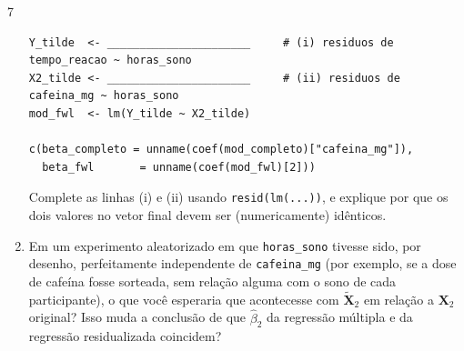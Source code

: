 \documentclass[11pt]{article}
\begin{document}
\begin{questao}{7}
\begin{enumerate}[label=(\alph*)]
\begin{lstlisting}
Y_tilde  <- ______________________     # (i) residuos de tempo_reacao ~ horas_sono
X2_tilde <- ______________________     # (ii) residuos de cafeina_mg ~ horas_sono
mod_fwl  <- lm(Y_tilde ~ X2_tilde)

c(beta_completo = unname(coef(mod_completo)["cafeina_mg"]),
  beta_fwl       = unname(coef(mod_fwl)[2]))
\end{lstlisting}
    Complete as linhas (i) e (ii) usando \texttt{resid(lm(...))}, e explique por que os dois
    valores no vetor final devem ser (numericamente) idênticos.
  \item Em um experimento aleatorizado em que \texttt{horas\_sono} tivesse sido, por desenho,
    perfeitamente independente de \texttt{cafeina\_mg} (por exemplo, se a dose de cafeína fosse
    sorteada, sem relação alguma com o sono de cada participante), o que você esperaria que
    acontecesse com $\tilde{\mathbf{X}}_2$ em relação a $\mathbf{X}_2$ original? Isso muda a
    conclusão de que $\hat\beta_2$ da regressão múltipla e da regressão residualizada coincidem?
\end{enumerate}
\end{questao}
\end{document}
